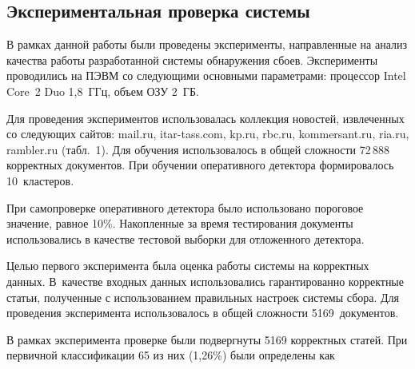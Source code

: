 \begin{multicols}{2}
\vspace*{-9pt}
  
\section{Экспериментальная проверка системы}

\vspace*{-2pt}
  
    В рамках данной работы были проведены эксперименты, направленные на 
анализ качества работы разработанной системы обнаружения сбоев. 
Эксперименты проводились на ПЭВМ со следующими основными 
параметрами: процессор Intel Core~2 Duo 1,8~ГГц, объем ОЗУ 2~ГБ.
  
    Для проведения экспериментов использовалась коллекция новостей, 
извлеченных со следующих сайтов: {\sf mail.ru}, {\sf itar-tass.com}, {\sf kp.ru}, {\sf 
rbc.ru}, \mbox{\sf kommersant}.{\sf ru}, {\sf ria.ru}, {\sf rambler.ru} 
(табл.~1). Для обучения 
использовалось в общей сложности 72\,888 корректных документов. При 
обучении оперативного детектора формировалось 10~кластеров.
  
    При самопроверке оперативного детектора было использовано пороговое 
значение, равное 10\%. Накопленные за время тестирования документы 
использовались в качестве тестовой выборки для отложенного детектора.
  
    Целью первого эксперимента была оценка работы системы на корректных 
данных. В~качестве входных данных использовались гарантированно 
корректные статьи, полученные с использованием
правильных настроек 
системы сбора. Для проведения эксперимента использовалось в общей 
сложности 5169~документов. 

  В рамках эксперимента проверке были подвергнуты 5169 корректных статей. 
При первичной классификации 65 из них (1,26\%) были определены как\linebreak\vspace*{-12pt}

\vspace*{6pt}



\end{multicols}
